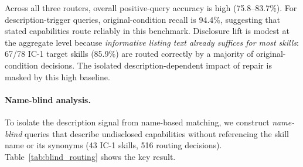 \documentclass[11pt]{article}
\begin{document}
\begin{table}[t]
\centering\small
{}
\caption{Overall routing accuracy (\%) by condition and
router (97 target skills: 78~IC-1 plus 19~IC-0 controls;
8,779~valid decisions across 3 routers).
Targeted disclosure changes overall accuracy by +1.0pp
for OpenClaw, +0.0pp for GPT-5.4-mini, and +1.8pp for
Gemini; these aggregate effects are descriptive, with the
pre-specified name-blind contrast tested in
Table~\ref{tab:blind_routing}.}
\label{tab:routing_benchmark}
\end{table}

Across all three routers, overall positive-query accuracy
is high (75.8--83.7\%).
For description-trigger queries, original-condition recall
is 94.4\%, suggesting that stated capabilities route
reliably in this benchmark.
Disclosure lift is modest at the aggregate level because
\emph{informative listing text already suffices for most
skills}: 67/78 IC-1 target skills (85.9\%) are routed
correctly by a majority of original-condition decisions.
The isolated description-dependent impact of repair is
masked by this high baseline.

\paragraph{Name-blind analysis.}
To isolate the description signal from name-based matching,
we construct \emph{name-blind} queries that describe
undisclosed capabilities without referencing the skill name
or its synonyms (43 IC-1 skills, 516 routing decisions).
Table~\ref{tab:blind_routing} shows the key result.
\end{document}
